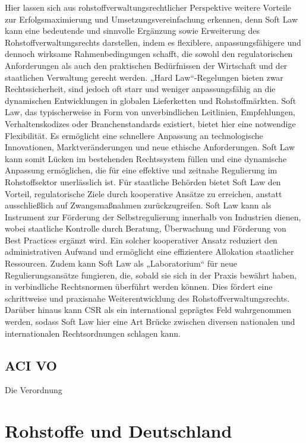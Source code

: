\documentclass[12pt,a4paper,oneside]{book} %
\begin{document}
	Hier lassen sich aus rohstoffverwaltungsrechtlicher Perspektive weitere Vorteile zur Erfolgsmaximierung und Umsetzungsvereinfachung erkennen, denn Soft Law kann eine bedeutende und sinnvolle Ergänzung sowie Erweiterung des Rohstoffverwaltungsrechts darstellen, indem es flexiblere, anpassungsfähigere und dennoch wirksame Rahmenbedingungen schafft, die sowohl den regulatorischen Anforderungen als auch den praktischen Bedürfnissen der Wirtschaft und der staatlichen Verwaltung gerecht werden. „Hard Law“-Regelungen bieten zwar Rechtssicherheit, sind jedoch oft starr und weniger anpassungsfähig an die dynamischen Entwicklungen in globalen Lieferketten und Rohstoffmärkten. Soft Law, das typischerweise in Form von unverbindlichen Leitlinien, Empfehlungen, Verhaltenskodizes oder Branchenstandards existiert, bietet hier eine notwendige Flexibilität. Es ermöglicht eine schnellere Anpassung an technologische Innovationen, Marktveränderungen und neue ethische Anforderungen. Soft Law kann somit Lücken im bestehenden Rechtssystem füllen und eine dynamische Anpassung ermöglichen, die für eine effektive und zeitnahe Regulierung im Rohstoffsektor unerlässlich ist. Für staatliche Behörden bietet Soft Law den Vorteil, regulatorische Ziele durch kooperative Ansätze zu erreichen, anstatt ausschließlich auf Zwangsmaßnahmen zurückzugreifen. Soft Law kann als Instrument zur Förderung der Selbstregulierung innerhalb von Industrien dienen, wobei staatliche Kontrolle durch Beratung, Überwachung und Förderung von Best Practices ergänzt wird. Ein solcher kooperativer Ansatz reduziert den administrativen Aufwand und ermöglicht eine effizientere Allokation staatlicher Ressourcen. Zudem kann Soft Law als „Laboratorium“ für neue Regulierungsansätze fungieren, die, sobald sie sich in der Praxis bewährt haben, in verbindliche Rechtsnormen überführt werden können. Dies fördert eine schrittweise und praxisnahe Weiterentwicklung des Rohstoffverwaltungsrechts. Darüber hinaus kann CSR als ein international geprägtes Feld wahrgenommen werden, sodass Soft Law hier eine Art Brücke zwischen diversen nationalen und internationalen Rechtsordnungen schlagen kann.
	
	
	\subsection{ACI VO}
	Die Verordnung 
	
	\section{Rohstoffe und Deutschland}
	
\end{document}
